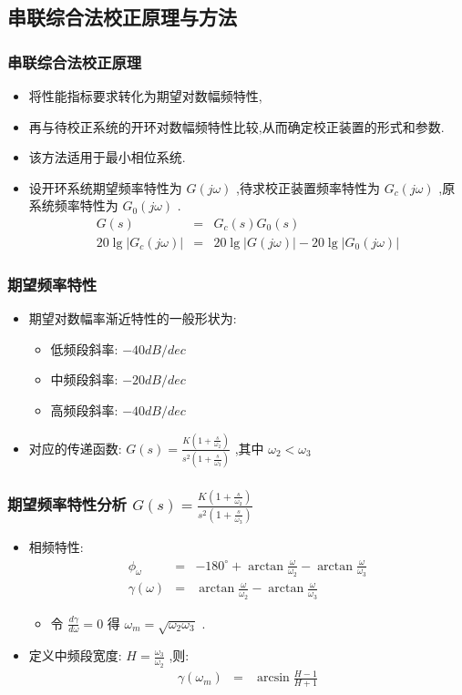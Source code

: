 \documentclass[table]{article}
\begin{document}
\subsection{串联综合法校正原理与方法}
\label{sec-5-1}
\begin{frame}
\frametitle{串联综合法校正原理}
\label{sec-5-1-1}

\begin{itemize}
\item <2->将性能指标要求转化为期望对数幅频特性,
\item <3->再与待校正系统的开环对数幅频特性比较,从而确定校正装置的形式和参数.
\item <4->该方法适用于最小相位系统.
\item <5->设开环系统期望频率特性为 $G(j\omega)$ ,待求校正装置频率特性为 $G_c(j\omega)$ ,原系统频率特性为 $G_0(j\omega)$ .
      \begin{eqnarray*}
      G(s) &= &G_c(s)G_0(s) \\
      20\lg|G_c(j\omega)| &=& 20\lg|G(j\omega)|-20\lg|G_0(j\omega)|
      \end{eqnarray*}
\end{itemize}
\end{frame}
\begin{frame}
\frametitle{期望频率特性}
\label{sec-5-1-2}

\begin{itemize}
\item 期望对数幅率渐近特性的一般形状为:
\begin{itemize}
\item 低频段斜率: $-40 dB/dec$
\item 中频段斜率: $-20 dB/dec$
\item 高频段斜率: $-40 dB/dec$
\end{itemize}
\item <2->对应的传递函数:  $G(s)=\frac{K(1+\frac{s}{\omega_2})}{s^2(1+\frac{s}{\omega_3})}$ ,其中 $\omega_2<\omega_3$
\end{itemize}
\end{frame}
\begin{frame}
\frametitle{期望频率特性分析 $G(s)=\frac{K(1+\frac{s}{\omega_2})}{s^2(1+\frac{s}{\omega_3})}$}
\label{sec-5-1-3}

\begin{itemize}
\item 相频特性:
      \begin{eqnarray*}
      \phi_{\omega} &=& -180^{\circ}+\arctan\frac{\omega}{\omega_2}-\arctan\frac{\omega}{\omega_3} \\
      \gamma(\omega) &=& \arctan\frac{\omega}{\omega_2}-\arctan\frac{\omega}{\omega_3} 
      \end{eqnarray*}
\begin{itemize}
\item 令  $\frac{d\gamma}{d\omega}=0$  得  $\omega_m=\sqrt{\omega_2\omega_3}$  .
\end{itemize}
\item <2->定义中频段宽度:  $H=\frac{\omega_3}{\omega_2}$ ,则:
      \begin{eqnarray*}
      \gamma(\omega_m) &= &\arcsin\frac{H-1}{H+1} 
      \end{eqnarray*}
\end{itemize}
\end{frame}
\end{document}
